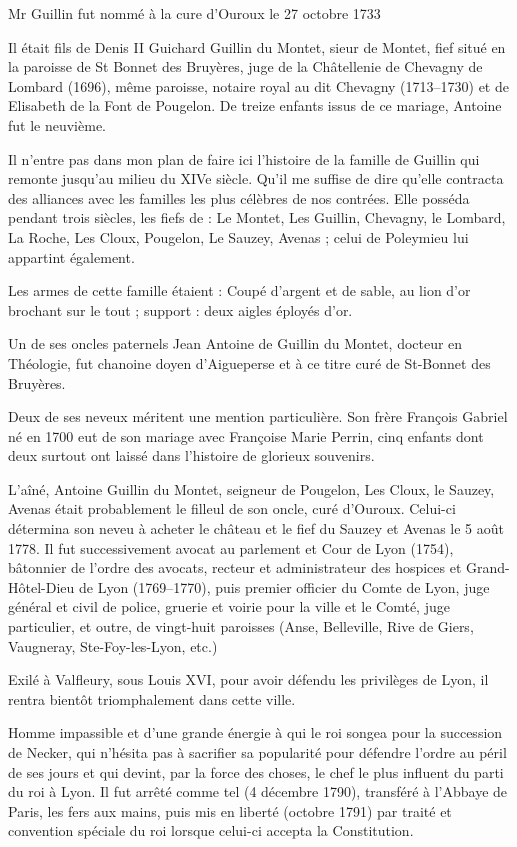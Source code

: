 Mr Guillin fut nommé à la cure d'Ouroux le 27 octobre 1733

Il était fils de Denis II Guichard Guillin du Montet, sieur de Montet, fief situé en la paroisse de St Bonnet des Bruyères, juge de la Châtellenie de Chevagny de Lombard (1696), même paroisse, notaire royal au dit Chevagny (1713--1730) et de Elisabeth de la Font de Pougelon. De treize enfants issus de ce mariage, Antoine fut le neuvième.

Il n'entre pas dans mon plan de faire ici l'histoire de la famille de Guillin qui remonte jusqu'au milieu du XIVe siècle. Qu'il me
suffise de dire qu'elle contracta des alliances avec les familles les plus célèbres de nos contrées. Elle posséda pendant trois siècles, les fiefs de : Le Montet, Les Guillin, Chevagny, le Lombard, La Roche, Les Cloux, Pougelon, Le Sauzey, Avenas ; celui de Poleymieu lui appartint également.

Les armes de cette famille étaient : Coupé d'argent et de sable, au lion d'or brochant sur le tout ; support : deux aigles éployés d'or.

Un de ses oncles paternels Jean Antoine de Guillin du Montet, docteur en Théologie, fut chanoine doyen d'Aigueperse et à ce titre curé de St-Bonnet des Bruyères.

Deux de ses neveux méritent une mention particulière. Son frère François Gabriel né en 1700 eut de son mariage avec Françoise Marie Perrin, cinq enfants dont deux surtout ont laissé dans l'histoire de glorieux souvenirs.

L'aîné, Antoine Guillin du Montet, seigneur de Pougelon, Les Cloux, le Sauzey, Avenas était probablement le filleul de son oncle, curé d'Ouroux. Celui-ci détermina son neveu à acheter le château et le fief du Sauzey et Avenas le 5 août 1778. Il fut successivement avocat au parlement et Cour de Lyon (1754), bâtonnier de l'ordre des avocats, recteur et administrateur des hospices et Grand-Hôtel-Dieu de Lyon (1769--1770), puis premier officier du Comte de Lyon, juge général et civil de police, gruerie et voirie pour la ville et le Comté, juge particulier, et outre, de vingt-huit paroisses (Anse, Belleville, Rive de Giers, Vaugneray, Ste-Foy-les-Lyon, etc.)

Exilé à Valfleury, sous Louis XVI, pour avoir défendu les privilèges de Lyon, il rentra bientôt triomphalement dans cette ville.

Homme impassible et d'une grande énergie à qui le roi songea pour la succession de Necker, qui n'hésita pas à sacrifier sa popularité pour défendre l'ordre au péril de ses jours et qui devint, par la force des choses, le chef le plus influent du parti du roi à Lyon. Il fut arrêté comme tel (4 décembre 1790), transféré à l'Abbaye de Paris, les fers aux mains, puis mis en liberté (octobre 1791) par traité et convention spéciale du roi lorsque celui-ci accepta la Constitution.

